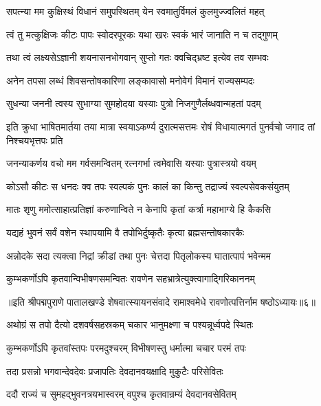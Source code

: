 \twolineshloka
{सपत्न्या मम कुक्षिस्थं विधानं समुपस्थितम्}
{येन स्वमातुर्विमलं कुलमुज्ज्वलितं महत्}%

\twolineshloka
{त्वं तु मत्कुक्षिजः कीटः पापः स्वोदरपूरकः}
{यथा खरः स्वकं भारं जानाति न च तद्गुणम्}%

\twolineshloka
{तथा त्वं लक्ष्यसेऽज्ञानी शयनासनभोगवान्}
{सुप्तो गतः क्वचिद्भ्रष्ट इत्येव तव सम्भवः}%

\twolineshloka
{अनेन तपसा लब्धं शिवसन्तोषकारिणा}
{लङ्कावासो मनोवेगं विमानं राज्यसम्पदः}%

\twolineshloka
{सुधन्या जननी त्वस्य सुभाग्या सुमहोदया}
{यस्याः पुत्रो निजगुणैर्लब्धवान्महतां पदम्}%

\twolineshloka
{इति क्रुधा भाषितमार्तया तया मात्रा स्वयाऽकर्ण्य दुरात्मसत्तमः}
{रोषं विधायात्मगतं पुनर्वचो जगाद तां निश्चयभृत्तपः प्रति}%


\twolineshloka
{जनन्याकर्णय वचो मम गर्वसमन्वितम्}
{रत्नगर्भा त्वमेवासि यस्याः पुत्रास्त्रयो वयम्}%

\twolineshloka
{कोऽसौ कीटः स धनदः क्व तपः स्वल्पकं पुनः}
{कालं का किन्तु तद्राज्यं स्वल्पसेवकसंयुतम्}%

\twolineshloka
{मातः शृणु ममोत्साहात्प्रतिज्ञां करुणान्विते}
{न केनापि कृतां कर्त्रा महाभाग्ये हि कैकसि}%

\twolineshloka
{यद्यहं भुवनं सर्वं वशेन स्थापयामि वै}
{तपोभिर्दुष्कृतैः कृत्वा ब्रह्मसन्तोषकारकैः}%

\twolineshloka
{अन्नोदके सदा त्यक्त्वा निद्रां क्रीडां तथा पुनः}
{चेत्तदा पितृलोकस्य घातात्पापं भवेन्मम}%

\twolineshloka
{कुम्भकर्णोऽपि कृतवान्विभीषणसमन्वितः}
{रावणेन सहभ्रात्रेत्युक्त्वागाद्गिरिकाननम्}%

{॥इति श्रीपद्मपुराणे पातालखण्डे शेषवात्स्यायनसंवादे रामाश्वमेधे रावणोत्पत्तिर्नाम षष्ठोऽध्यायः॥६॥}

\resetShloka


\twolineshloka
{अथोग्रं स तपो दैत्यो दशवर्षसहस्रकम्}
{चकार भानुमक्ष्णा च पश्यन्नूर्ध्वपदे स्थितः}%

\twolineshloka
{कुम्भकर्णोऽपि कृतवांस्तपः परमदुश्चरम्}
{विभीषणस्तु धर्मात्मा चचार परमं तपः}%

\twolineshloka
{तदा प्रसन्नो भगवान्देवदेवः प्रजापतिः}
{देवदानवयक्षादि मुकुटैः परिसेवितः}%

\twolineshloka
{ददौ राज्यं च सुमहद्भुवनत्रयभास्वरम्}
{वपुश्च कृतवान्रम्यं देवदानवसेवितम्}%

